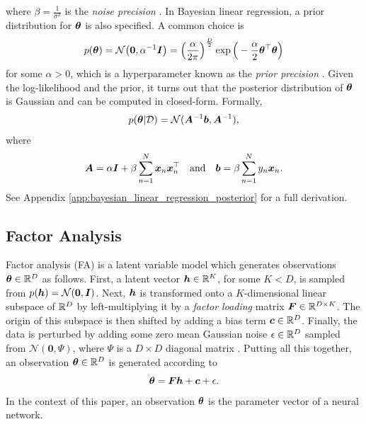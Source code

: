 \documentclass[10pt]{article} %
\begin{document}
where $\beta = \frac{1}{\sigma^2}$ is the \emph{noise precision} \citep{barber2007}. In Bayesian linear regression, a prior distribution for ${\bm{\theta}}$ is also specified. A common choice  is 
\begin{equation}
\label{eqn:linear_regression_prior}
    p({\bm{\theta}}) = \mathcal{N}\big(\mathbf{0}, \alpha^{-1} {\bm{I}} \big) = \Big(\frac{\alpha}{2\pi}\Big)^{\frac{D}{2}} \exp\Big(-\frac{\alpha}{2} {\bm{\theta}}^\top {\bm{\theta}} \Big)
\end{equation}
for some $\alpha > 0$, which is a hyperparameter known as the \emph{prior precision} \citep{barber2007}. Given the log-likelihood and the prior, it turns out that the posterior distribution of ${\bm{\theta}}$ is Gaussian and can be computed in closed-form. Formally, 
\begin{equation}
\label{eqn:linear_regression_posterior}
    p({\bm{\theta}} | \mathcal{D}) = \mathcal{N}( {\bm{A}}^{-1} {\bm{b}}, {\bm{A}}^{-1}),
\end{equation}
where
\begin{equation}
\label{eqn:linear_model_A_and_b}
    {\bm{A}} = \alpha {\bm{I}} + \beta \sum_{n=1}^N {\bm{x}}_n {\bm{x}}_n^\top \quad \text{and} \quad {\bm{b}} = \beta \sum_{n=1}^N y_n {\bm{x}}_n.
\end{equation}
See Appendix \ref{app:bayesian_linear_regression_posterior} for a full derivation.
\subsection{Factor Analysis}
\label{sec:fa}

Factor analysis (FA) is a latent variable model which generates observations ${\bm{\theta}} \in \mathbb{R}^D$ as follows. First, a latent vector ${\bm{h}} \in \mathbb{R}^K$, for some $K < D$, is sampled from $p({\bm{h}}) = \mathcal{N}(\mathbf{0}, {\bm{I}})$. Next, ${\bm{h}}$ is transformed onto a $K$-dimensional linear subspace of $\mathbb{R}^D$ by left-multiplying it by a \emph{factor loading} matrix ${\bm{F}} \in \mathbb{R}^{D \times K}$. The origin of this subspace is then shifted by adding a bias term ${\bm{c}} \in \mathbb{R}^D$. Finally, the data is perturbed by adding some zero mean Gaussian noise $\mathbf{\epsilon} \in \mathbb{R}^D$ sampled from $\mathcal{N}(\mathbf{0}, \Psi)$, where $\Psi$ is a $D\times D$ diagonal matrix \citep{barber2007}. Putting all this together, an observation ${\bm{\theta}} \in \mathbb{R}^D$ is generated according to 
\begin{equation}\label{eqn:fa_model}
	{\bm{\theta}} = {\bm{F}} {\bm{h}} + {\bm{c}} + \mathbf{\epsilon}.
\end{equation}
In the context of this paper, an observation ${\bm{\theta}}$ is the parameter vector of a neural network. 
\end{document}
